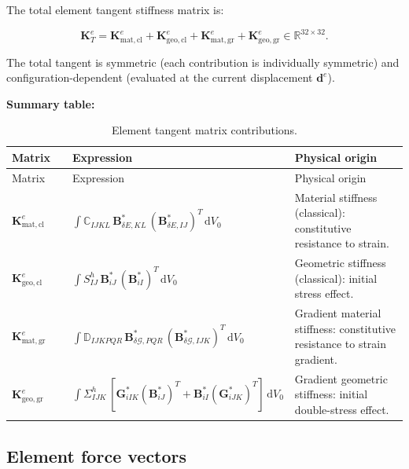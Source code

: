 \documentclass[11pt]{article}
\begin{document}
The total element tangent stiffness matrix is:

\begin{equation}
\boxed{
\mathbf{K}_{T}^{e}
= \mathbf{K}_{\mathrm{mat,cl}}^{e}
+ \mathbf{K}_{\mathrm{geo,cl}}^{e}
+ \mathbf{K}_{\mathrm{mat,gr}}^{e}
+ \mathbf{K}_{\mathrm{geo,gr}}^{e}
\in \mathbb{R}^{32\times 32}.
}
\label{s7:K_total}
\end{equation}

The total tangent is symmetric (each contribution is individually
symmetric) and configuration-dependent (evaluated at the current
displacement $\mathbf{d}^{e}$).

\textbf{Summary table:}

\begin{longtable}[c]{>{\raggedright\arraybackslash}p{0.18\linewidth}
>{\raggedright\arraybackslash}p{0.42\linewidth}
>{\raggedright\arraybackslash}p{0.40\linewidth}}
\caption{Element tangent matrix contributions.}
\label{tab:tangent_contributions}\\
\toprule
Matrix & Expression & Physical origin \\
\midrule
\endfirsthead
\toprule
Matrix & Expression & Physical origin \\
\midrule
\endhead
$\mathbf{K}_{\mathrm{mat,cl}}^{e}$
& $\int \mathbb{C}_{IJKL}\,\mathbf{B}_{\delta E,KL}^{*}\,(\mathbf{B}_{\delta E,IJ}^{*})^{T}\,\mathrm{d}V_{0}$
& Material stiffness (classical): constitutive resistance to strain. \\
\midrule
$\mathbf{K}_{\mathrm{geo,cl}}^{e}$
& $\int S_{IJ}^{h}\,\mathbf{B}_{iJ}^{*}\,(\mathbf{B}_{iI}^{*})^{T}\,\mathrm{d}V_{0}$
& Geometric stiffness (classical): initial stress effect. \\
\midrule
$\mathbf{K}_{\mathrm{mat,gr}}^{e}$
& $\int \mathbb{D}_{IJKPQR}\,\mathbf{B}_{\delta\mathcal{G},PQR}^{*}\,(\mathbf{B}_{\delta\mathcal{G},IJK}^{*})^{T}\,\mathrm{d}V_{0}$
& Gradient material stiffness: constitutive resistance to strain gradient. \\
\midrule
$\mathbf{K}_{\mathrm{geo,gr}}^{e}$
& $\int \Sigma_{IJK}^{h}\,[\mathbf{G}_{iIK}^{*}(\mathbf{B}_{iJ}^{*})^{T}+\mathbf{B}_{iI}^{*}(\mathbf{G}_{iJK}^{*})^{T}]\,\mathrm{d}V_{0}$
& Gradient geometric stiffness: initial double-stress effect. \\
\bottomrule
\end{longtable}

\subsection{Element force vectors}
\label{ssec:force_vectors}
\end{document}
